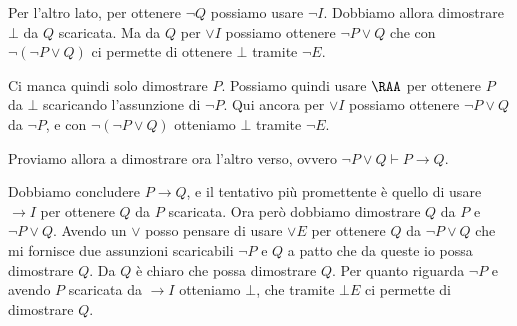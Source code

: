 Per l'altro lato, per ottenere \(\neg Q\) possiamo usare \(\neg I\). Dobbiamo allora dimostrare \(\bot\) da \(Q\) scaricata. Ma da \(Q\) per \(\lor I\) possiamo ottenere \(\neg P \lor Q\) che con \(\neg (\neg P \lor Q)\) ci permette di ottenere \(\bot\) tramite \(\neg E\).

Ci manca quindi solo dimostrare \(P\). Possiamo quindi usare \(\RAA\) per ottenere \(P\) da \(\bot\) scaricando l'assunzione di \(\neg P\). Qui ancora per \(\lor I\) possiamo ottenere \(\neg P \lor Q\) da \(\neg P\), e con \(\neg (\neg P \lor Q)\) otteniamo \(\bot\) tramite \(\neg E\).

Proviamo allora a dimostrare ora l'altro verso, ovvero \(\neg P \lor Q \vdash P\to Q\).

Dobbiamo concludere \(P\to Q\), e il tentativo più promettente è quello di usare \(\to I\) per ottenere \(Q\) da \(P\) scaricata. Ora però dobbiamo dimostrare \(Q\) da \(P\) e \(\neg P \lor Q\). Avendo un \(\lor\) posso pensare di usare \(\lor E\) per ottenere \(Q\) da \(\neg P \lor Q\) che mi fornisce due assunzioni scaricabili \(\neg P\) e \(Q\) a patto che da queste io possa dimostrare \(Q\). Da \(Q\) è chiaro che possa dimostrare \(Q\). Per quanto riguarda \(\neg P\) e avendo \(P\) scaricata da \(\to I\) otteniamo \(\bot\), che tramite \(\bot E\) ci permette di dimostrare \(Q\).